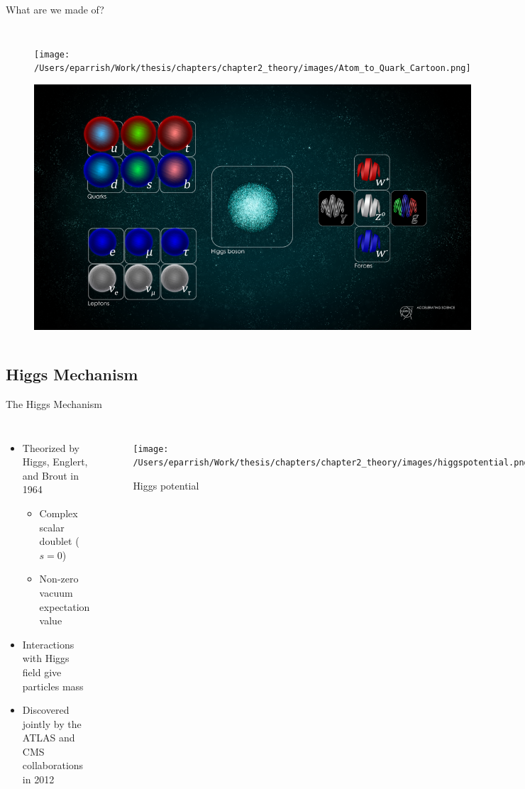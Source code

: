 \documentclass[aspectratio=169,xcolor=table]{beamer}
\begin{document}
\begin{frame}[t]{What are we made of?}
\begin{columns}
\begin{figure}
        \centering
        \texttt{[image: /Users/eparrish/Work/thesis/chapters/chapter2\_theory/images/Atom\_to\_Quark\_Cartoon.png]}
        \caption{\tiny\cite{atom-to-quark}}
        \includegraphics[width=\textwidth,keepaspectratio=true]{STDM higgs and field D.png}
      \end{figure}
    \end{columns}
  \end{frame}

  \subsection{Higgs Mechanism}

  \begin{frame}[t]{The Higgs Mechanism}
    \begin{columns}
      \begin{itemize}
        \item Theorized by Higgs, Englert, and Brout in 1964
          \begin{itemize}
            \item Complex scalar doublet ($s=0$)
            \item Non-zero vacuum expectation value
          \end{itemize}
        \item Interactions with Higgs field give particles mass
        \item Discovered jointly by the ATLAS and CMS collaborations in 2012
      \end{itemize}
      \begin{figure}
        \texttt{[image: /Users/eparrish/Work/thesis/chapters/chapter2\_theory/images/higgspotential.png]}
        \caption{\tiny Higgs potential \cite{Higgs-phys}}
      \end{figure}
      \vspace{-.80cm}
      \begin{figure}
        \texttt{[image: /Users/eparrish/Work/thesis/chapters/chapter2\_theory/images/Higgs\_Discovery\_gam\_gam.jpeg]}
        \caption{\tiny Higgs discovery \cite{higgs-discovery-atlas}}
      \end{figure}
    \end{columns}
  \end{frame}
\end{document}
